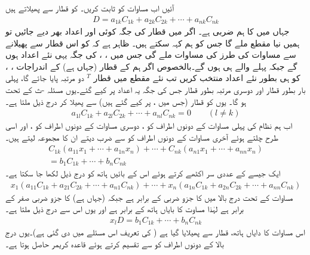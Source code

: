 آئیں اب مساوات  کو ثابت کریں۔ کو قطار  سے پھیلاتے ہیں
\begin{align}\label{مساوات_الجبرا_ثبوت_الف}
D=a_{1k}C_{1k}+a_{2k}C_{2k}+\cdots+a_{nk}C_{nk}
\end{align}
جہاں  میں  کا ہم ضربی  ہے۔ اگر  میں قطار  کی جگہ کوئی اور اعداد بھر دیے جائیں تو ہمیں نیا مقطع ملے گا جس کو ہم  کہہ سکتے ہیں۔ ظاہر ہے کہ  کو اس  قطار سے پھیلانے سے مساوات   کی طرز کی مساوات ملے گی جس میں ، ،  کی جگہ یہی نئے اعداد ہوں گے جبکہ  پہلے والے ہی ہوں گے۔بالخصوص اگر ہم  کے قطار   (جہاں  ہے)  کے اندراجات ، ،  کو  ہی بطور نئے اعداد منتخب کریں تب نئے مقطع  میں قطار 
\begin{math}
[\begin{matrix}a_{1l}&\cdots&a_{nl}  \end{matrix}]^T
\end{math}
دو مرتبہ پایا جائے گا، پہلی بار بطور قطار  اور دوسری مرتبہ بطور قطار  جس کی جگہ یہ اعداد پر کیے گئے۔یوں مسئلہ -ث کے تحت  ہو گا۔ یوں  کو قطار  (جس میں ،  پر کیے گئے ہیں) سے پھیلا کر درج ذیل ملتا ہے۔
\begin{align}\label{مساوات_الجبرا_ثبوت_ب}
a_{1l}C_{1k}+a_{2l}C_{2k}+\cdots+a_{nl}C_{nk}=0\quad\quad (l \ne k)
\end{align}
اب ہم نظام  کی پہلی مساوات کے دونوں اطراف کو ، دوسری مساوات کے دونوں اطراف کو ، اور اسی طرح چلتے ہوئے آخری مساوات کے دونوں اطراف کو  سے ضرب دیتے ان کا مجموعہ لیتے ہیں۔
\begin{multline}\label{مساوات_الجبرا_ثبوت_پ}
C_{1k}(a_{11}x_1+\cdots+a_{1n}x_n)+\cdots+C_{nk}(a_{n1}x_1+\cdots+a_{nn}x_n)\\
=b_1C_{1k}+\cdots+b_nC_{nk}
\end{multline}
ایک جیسے  کے عددی سر اکٹھے کرتے ہوئے اس کے بائیں ہاتھ کو درج ذیل لکھا جا سکتا ہے۔
\begin{align*}
x_1(a_{11}C_{1k}+a_{21}C_{2k}+\cdots+a_{n1}C_{nk})+\cdots+x_n(a_{1n}C_{1k}+a_{2n}C_{2k}+\cdots+a_{nn}C_{nk})
\end{align*}
مساوات  کے تحت درج بالا میں   کا جزو ضربی  کے برابر ہے جبکہ  (جہاں  ہے) کا جزو ضربی صفر کے برابر ہے لہٰذا  مساوت  کا بایاں ہاتھ  کے برابر ہے اور یوں اس سے درج ذیل ملتا ہے۔
\begin{align*}
x_l D=b_1C_{1k}+\cdots+b_nC_{nk}
\end{align*}
اس مساوات کا دایاں ہاتھ، قطار  سے پھیلایا گیا  ہے ( کی تعریف اس مسئلے میں دی گئی ہے)۔یوں درج بالا کے دونوں اطراف کو  سے تقسیم کرتے ہوئے قاعدہ کریمر حاصل ہوتا ہے۔

